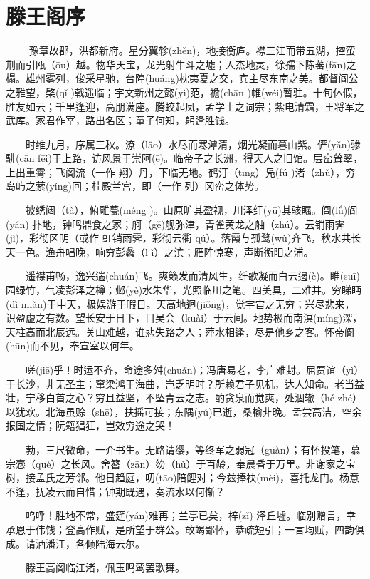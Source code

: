 \documentclass[fontset=none]{ctexart}
\begin{document}
\section{滕王阁序}
　　 豫章故郡，洪都新府。星分翼轸(zhěn)，地接衡庐。襟三江而带五湖，控蛮荆而引瓯（ōu）越。物华天宝，龙光射牛斗之墟；人杰地灵，徐孺下陈蕃(fān)之榻。雄州雾列，俊采星驰，台隍(huáng)枕夷夏之交，宾主尽东南之美。都督阎公之雅望，棨(qǐ )戟遥临；宇文新州之懿(yì)范，襜(chān )帷(wéi)暂驻。十旬休假，胜友如云；千里逢迎，高朋满座。腾蛟起凤，孟学士之词宗；紫电清霜，王将军之武库。家君作宰，路出名区；童子何知，躬逢胜饯。

　　时维九月，序属三秋。潦（lǎo）水尽而寒潭清，烟光凝而暮山紫。俨(yǎn)骖騑(cān fēi)于上路，访风景于崇阿(ē)。临帝子之长洲，得天人之旧馆。层峦耸翠，上出重霄；飞阁流（一作 翔）丹，下临无地。鹤汀（tīng）凫(fú )渚（zhǔ），穷岛屿之萦(yíng)回；桂殿兰宫，即（一作 列）冈峦之体势。

　　披绣闼（tà），俯雕甍(méng )。山原旷其盈视，川泽纡(yū)其骇瞩。闾(lǘ)阎(yán) 扑地，钟鸣鼎食之家；舸（gě)舰弥津，青雀黄龙之舳（zhú）。云销雨霁(jì)，彩彻区明（或作 虹销雨霁，彩彻云衢 qú）。落霞与孤鹜(wù)齐飞，秋水共长天一色。渔舟唱晚，响穷彭蠡（l ǐ）之滨；雁阵惊寒，声断衡阳之浦。

　　遥襟甫畅，逸兴遄(chuán)飞。爽籁发而清风生，纤歌凝而白云遏(è)。睢(suī)园绿竹，气凌彭泽之樽；邺(yè)水朱华，光照临川之笔。四美具，二难并。穷睇眄(dì miǎn)于中天，极娱游于暇日。天高地迥(jiǒng)，觉宇宙之无穷；兴尽悲来，识盈虚之有数。望长安于日下，目吴会（kuài）于云间。地势极而南溟(míng)深，天柱高而北辰远。关山难越，谁悲失路之人；萍水相逢，尽是他乡之客。怀帝阍(hūn)而不见，奉宣室以何年。

　　嗟(jiē)乎！时运不齐，命途多舛(chuǎn)；冯唐易老，李广难封。屈贾谊（yì）于长沙，非无圣主；窜梁鸿于海曲，岂乏明时？所赖君子见机，达人知命。老当益壮，宁移白首之心？穷且益坚，不坠青云之志。酌贪泉而觉爽，处涸辙（hé zhé）以犹欢。北海虽赊（shē），扶摇可接；东隅(yú)已逝，桑榆非晚。孟尝高洁，空余报国之情；阮籍猖狂，岂效穷途之哭！

　　勃，三尺微命，一介书生。无路请缨，等终军之弱冠（guàn）；有怀投笔，慕宗悫（què）之长风。舍簪（zān）笏（hù）于百龄，奉晨昏于万里。非谢家之宝树，接孟氏之芳邻。他日趋庭，叨(tāo)陪鲤对；今兹捧袂(mèi)，喜托龙门。杨意不逢，抚凌云而自惜；钟期既遇，奏流水以何惭？

　　呜呼！胜地不常，盛筵(yán)难再；兰亭已矣，梓(zǐ) 泽丘墟。临别赠言，幸承恩于伟饯；登高作赋，是所望于群公。敢竭鄙怀，恭疏短引；一言均赋，四韵俱成。请洒潘江，各倾陆海云尔。　

　　滕王高阁临江渚，佩玉鸣鸾罢歌舞。
\end{document}
